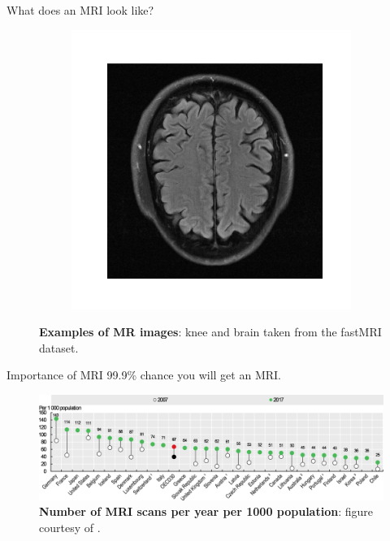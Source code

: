 \begin{frame}{What does an MRI look like?}
\begin{figure}
\begin{subfigure}{0.45\textwidth}
            \includegraphics[height=0.6\textheight]{Figures/intro_figures/brain_mri.png}  
        \end{subfigure}
        \caption{\label{fig:mri-example} \textbf{Examples of MR images}: knee and brain taken from the fastMRI dataset.}
    \end{figure}
\end{frame}

\begin{frame}{Importance of MRI}
    99.9\% chance you will get an MRI.
    \begin{figure}
        \centering
        \includegraphics[width=\textwidth]{Figures/intro_figures/num_mri_scans.png}
        \caption{\label{fig:num-mri-scans} \textbf{Number of MRI scans per year per 1000 population}: figure courtesy of \citet{OECDMRI}.}
    \end{figure}
\end{frame}

